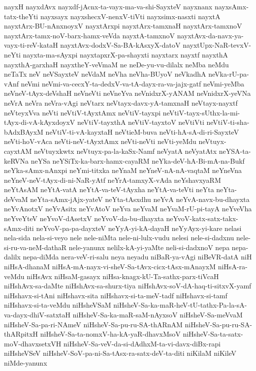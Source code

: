 {nayxH
nayxdAvx
nayxdf-jAcnx-ta-vayx-ma-va-shi-SayxteV
nayxnanx
nayxsAmx-tatx-theYti
nayxsayx
nayxshecxV-nenxV-tiVti
nayxsimx-nasxti
nayxtA
nayxtArx-BU-nAnxnoyxV
nayxtArxpi
nayxtArx-tamxnaH
nayxtArx-tamxnoV
nayxtArx-tamx-noV-barx-hamx-veVda
nayxtA-tamxnoV
nayxtAvx-da-navx-ya-vayx-ti-reV-kataH
nayxtAvx-dodxV-Sa-BA-kAsxyX-datoV
nayxtUpx-NaR-tevxV-neYti
nayxta-ma-sAyxpi
nayxtapxrX-pa-shayxti
nayxtarx
nayxtf
nayxthA
nayxthA-garxhaH
nayxtheY-veVmaM
ne
neDe-yu-vu-dilalx
neMba
neMdu
neTaTx
neV
neVSayxteV
neVdaM
neVha
neVha-BUyoV
neVkadhA
neVka-rU-pa-vAnf
neVmi
neVmi-va-cecxY-ta-dedxV-va-tA-dayx-ra-va-jajx-gatf
neVmi-yeMba
neVneV-tAyx-deVshaH
neVneVti
neVneYva
neVnidxrX-yANAM
neVnidxrX-yeVNa
neVrA
neVra
neVra-vAgi
neVtarx
neVtayx-davx-yA-tamxnaH
neVtayx-nayxtf
neVteyxVva
neVti
neVtiV-tAyxtAmx
neVtiV-tayxpi
neVtiV-tayx-sUthx-la-mi-tAyx-di-vA-kAyxdoyxV
neVtiV-tayxthA
neVtiV-tayxtoV
neVtiVti
neVtiV-ti-sha-bAdxBAyxM
neVtiV-ti-vA-kayxtaH
neVtieM-buva
neVti-hA-sA-di-ri-SayxteV
neVti-hoV-vAca
neVti-neV-tAyxtAmx
neVti-neVti
neVti-yeMdu
neVtuyx-cayxtAM
neVtuyxkwtx
neVtuyx-pa-la-kaSx-Namf
neVyatA
neVyatAtx
neYSA-ta-keRVNa
neYSa
neYSiTx-ka-barx-hamx-cayaRM
neYka-deV-hA-Bi-mA-na-Bukf
neYka-sAmx-nAnxpi
neYmi-titxka
neYnaM
neYneV-nA-nA-vaqtaM
neYneVna
neYneV-neV-tAyx-di-ni-NaR-yAtf
neYrA-tamxyX-vAda
neYshavxyaRM
neYtAsAM
neYtA-vatA
neYtA-va-teV-tAyxha
neYtA-va-teVti
neYta
neYta-deVvaM
neYta-sAmx-jAjx-yateV
neYta-tAsxdhu
neYvA
neYvA-navx-bu-dhayxta
neYvAnotxV
neYvAsitx
neYvAtoV
neYva
neYvaM
neYvaM-rU-pi-tayA
neYveVha
neYveYteV
neYvoV-dAsetxV
neYvoV-da-bu-dhayxta
neYvoV-katx-satx-takx-sAmx-diti
neYvoV-pa-pa-dayxteV
neYyA-yi-kA-dayaH
neYyAyx-yi-kare
nelasi
nela-sida
nela-si-veyo
nele
nele-niMta
nele-ni-lulx-vudu
nelesi
nele-si-dadxnu
nele-si-ru-va-neM-dathaR
nele-yanunx
nelilx-kA-yi-yaMte
neli-si-dadxnoV
nepa
nepa-dalilx
nepa-diMda
nera-veV-ri-salu
neya
neyadu
niBaR-ya-vAgi
niBeVR-datA
niH
niHsA-dhanaM
niHsA-mA-nayx-vi-sheV-Sa-tAvx-cicx-tAsx-mAnayxM
niHsA-ra-veMdu
niHsAvx
niHsaM-gasayx
niHsa-knagx-kU-Ta-sathx-parx-tiVcaH
niHshAvx-sa-daMte
niHshAvx-sa-shurx-tiya
niHshAvx-soV-dA-haq-ti-sitxvX-yamf
niHshavx-si-tAni
niHshavx-sita
niHshavx-si-ta-meV-tadf
niHshavx-si-tamf
niHshavx-si-ta-veMdu
niHsheVSaM
niHsheV-Sa-ka-maR-heV-tU-tathx-Pa-la-sA-va-dayx-dhiV-satxtaH
niHsheV-Sa-ka-maR-saM-nAyxsoV
niHsheV-Sa-meVvaM
niHsheV-Sa-pa-ri-NAmeV
niHsheV-Sa-pu-ru-SA-thARnAM
niHsheV-Sa-pu-ru-SA-thARpitxH
niHsheV-Sa-ta-nomxV-ha-kA-yaR-dhavxMsoV
niHsheV-Sa-ta-satx-moV-dhavxsetxVH
niHsheV-Sa-veV-da-si-dAdhxM-ta-vi-davx-diBx-rapi
niHsheVSeV
niHsheV-SoV-pa-ni-Sa-tAsx-ra-satx-deV-ta-diti
niKilaM
niKileV
niMde-yanunx
}
